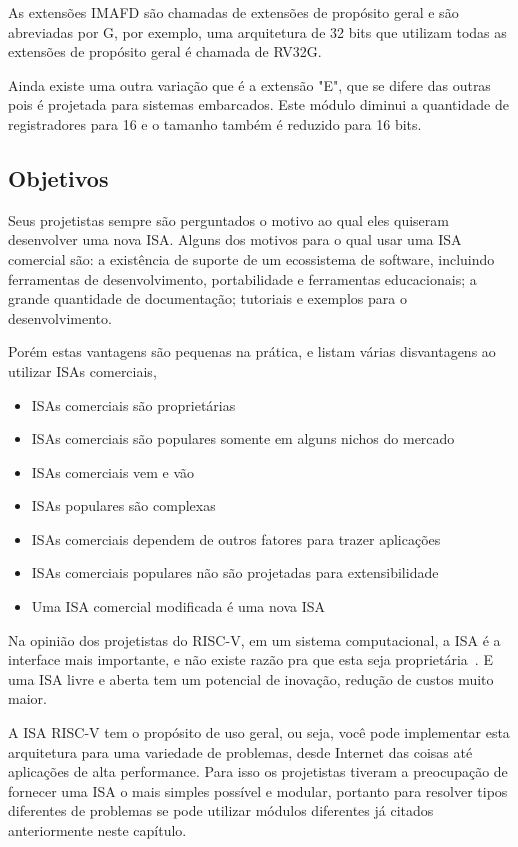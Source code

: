 	As extensões IMAFD são chamadas de extensões de propósito geral e são abreviadas por G, por exemplo, uma arquitetura de 32 bits que utilizam todas as extensões de propósito geral é chamada de RV32G.

	Ainda existe uma outra variação que é a extensão "E", que se difere das outras pois é projetada para sistemas embarcados. Este módulo diminui a quantidade de registradores para 16 e o tamanho também é reduzido para 16 bits.

	\subsection{Objetivos}

		Seus projetistas sempre são perguntados o motivo ao qual eles quiseram desenvolver uma nova ISA. Alguns dos motivos para o qual usar uma ISA comercial são: a existência de suporte de um ecossistema de software, incluindo ferramentas de desenvolvimento, portabilidade e ferramentas educacionais; a grande quantidade de documentação; tutoriais e exemplos para o desenvolvimento.

		Porém estas vantagens são pequenas na prática, e listam várias disvantagens ao utilizar ISAs comerciais,

		\begin{itemize}
			\item ISAs comerciais são proprietárias
			\item ISAs comerciais são populares somente em alguns nichos do mercado
			\item ISAs comerciais vem e vão
			\item ISAs populares são complexas
			\item ISAs comerciais dependem de outros fatores para trazer aplicações
			\item ISAs comerciais populares não são projetadas para extensibilidade
			\item Uma ISA comercial modificada é uma nova ISA
		\end{itemize}

		Na opinião dos projetistas do RISC-V, em um sistema computacional, a ISA é a interface mais importante, e não existe razão pra que esta seja proprietária~\cite{Waterman:EECS-2016-1}. E uma ISA livre e aberta tem um potencial de inovação, redução de custos muito maior. 

		A ISA RISC-V tem o propósito de uso geral, ou seja, você pode implementar esta arquitetura para uma variedade de problemas, desde Internet das coisas até aplicações de alta performance. Para isso os projetistas tiveram a preocupação de fornecer uma ISA o mais simples possível e modular, portanto para resolver tipos diferentes de problemas se pode utilizar módulos diferentes já citados anteriormente neste capítulo.

